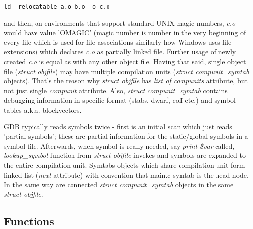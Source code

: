 \documentclass{report}
\begin{document}
\begin{verbatim}
ld -relocatable a.o b.o -o c.o
\end{verbatim}
and then, on environments that support standard UNIX magic numbers, \textit{c.o} would have value 'OMAGIC' (magic number is number in the very beginning of every file which is used for file associations similarly how Windows uses file extensions) which declares \textit{c.o} as \underline{partially linked file}. Further usage of newly created \textit{c.o} is equal as with any other object file.
Having that said, single object file (\textit{struct objfile}) may have multiple compilation units (\textit{struct compunit\_symtab} objects). That's the reason why \textit{struct objfile} has \textit{list of compunits} attribute, but not just single \textit{compunit} attribute.
Also, \textit{struct compunit\_symtab} contains debugging information in specific format (stabs, dwarf, coff etc.) and symbol tables a.k.a. blockvectors. 

GDB typically reads symbols twice - first is an initial scan which just
reads 'partial symbols'; these are partial information for the
static/global symbols in a symbol file.
Afterwards, when symbol is really needed, say \textit{print \$var} called, \textit{lookup\_symbol} function from \textit{struct objfile} invokes and symbols are expanded to the entire compilation unit.
Symtabs objects which share compilation unit form linked list (\textit{next} attribute) with convention that main.c symtab is the head node.
In the same way are connected \textit{struct compunit\_symtab} objects in the same \textit{struct objfile}. 
\subsection *{Functions}
\inputminted{c}{important_gdb_functions.c}	
\end{document}
